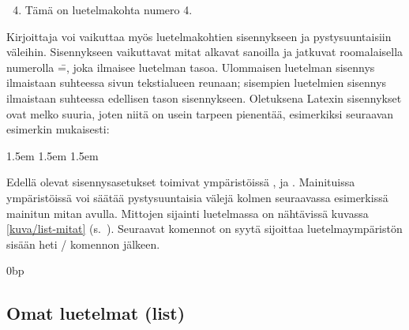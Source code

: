 \begin{koodilohkosis}
\begin{enumerate}
  \setcounter{enumi}{3}
\item Tämä on luetelmakohta numero 4.
\end{enumerate}
\end{koodilohkosis}

\noindent
Kirjoittaja voi vaikuttaa myös luetelmakohtien sisennykseen ja
pystysuuntaisiin väleihin. Sisennykseen vaikuttavat mitat alkavat
sanoilla  ja jatkuvat roomalaisella numerolla
\==, joka ilmaisee luetelman tasoa. Ulommaisen
luetelman sisennys ilmaistaan suhteessa sivun tekstialueen reunaan;
sisempien luetelmien sisennys ilmaistaan suhteessa edellisen tason
sisennykseen. Oletuksena Latexin sisennykset ovat melko suuria, joten
niitä on usein tarpeen pienentää, esimerkiksi seuraavan esimerkin
mukaisesti:

\begin{koodilohkosis}
\setlength{\leftmargini}  {1.5em} %
\setlength{\leftmarginii} {1.5em}
\setlength{\leftmarginiii}{1.5em}
\setlength{\leftmarginiv} {1.5em}
\end{koodilohkosis}

\noindent
Edellä olevat sisennysasetukset toimivat ympäristöissä
,  ja .
Mainituissa ympäristöissä voi säätää pystysuuntaisia välejä kolmen
seuraavassa esimerkissä mainitun mitan avulla. Mittojen sijainti
luetelmassa on nähtävissä kuvassa \ref{kuva/list-mitat}
(s.~\pageref{kuva/list-mitat}). Seuraavat komennot on syytä sijoittaa
luetelmaympäristön sisään heti \-/ komennon jälkeen.

\begin{koodilohkosis}
\setlength{\parsep} {0bp}   %
\setlength{\itemsep}{3bp}   %
\setlength{\parskip}{1.2ex} %
\end{koodilohkosis}

\subsection{Omat luetelmat (list)}
\label{luku/list-ympäristö}

